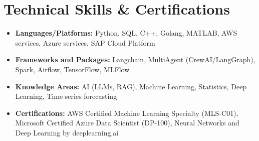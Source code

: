 \documentclass[letterpaper,11pt]{article}
\begin{document}
\section{Technical Skills \& Certifications}
\begin{itemize}[leftmargin=0.15in, label={}]
    \item \small{\textbf{Languages/Platforms:} Python, SQL, C++, Golang, MATLAB, AWS services, Azure services, SAP Cloud Platform}
    \item \small{\textbf{Frameworks and Packages:} Langchain, MultiAgent (CrewAI/LangGraph), Spark, Airflow, TensorFlow, MLFlow}
    \item \small{\textbf{Knowledge Areas:} AI (LLMs, RAG), Machine Learning, Statistics, Deep Learning, Time-series forecasting}
    \item \small{\textbf{Certifications:} AWS Certified Machine Learning Specialty (MLS-C01), Microsoft Certified Azure Data Scientist (DP-100), Neural Networks and Deep Learning by deeplearning.ai}
\end{itemize}
\end{document}
